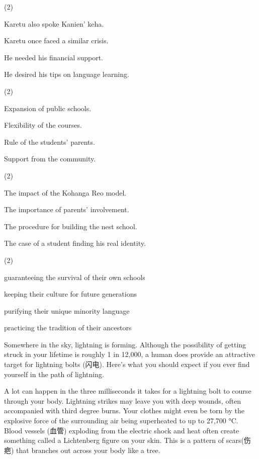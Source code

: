 \documentclass{英语试卷}
\begin{document}
\begin{choices}(2)
  \item Karetu also spoke Kanien' keha.
  \item Karetu once faced a similar crisis.
  \item He needed his financial support.
  \item He desired his tips on language learning.
\end{choices}
\begin{choices}(2)
  \item Expansion of public schools.
  \item Flexibility of the courses.
  \item Rule of the students' parents.
  \item Support from the community.
\end{choices}
\begin{choices}(2)
  \item The impact of the Kohanga Reo model.
  \item The importance of parents' involvement.
  \item The procedure for building the nest school.
  \item The case of a student finding his real identity.
\end{choices}
\begin{choices}(2)
  \item guaranteeing the survival of their own schools
  \item keeping their culture for future generations
  \item purifying their unique minority language
  \item practicing the tradition of their ancestors
\end{choices}
\par Somewhere in the sky, lightning is forming. Although the possibility of getting struck in your lifetime is roughly 1 in 12,000, a human does provide an attractive target for lightning bolts (闪电). Here's what you should expect if you ever find yourself in the path of lightning.\par
\par A lot can happen in the three milliseconds it takes for a lightning bolt to course through your body. Lightning strikes may leave you with deep wounds, often accompanied with third degree burns. Your clothes might even be torn by the explosive force of the surrounding air being superheated to up to 27,700 °C. Blood vessels (血管) exploding from the electric shock and heat often create something called a Lichtenberg figure on your skin. This is a pattern of scars(伤疤) that branches out across your body like a tree.\par
\end{document}
